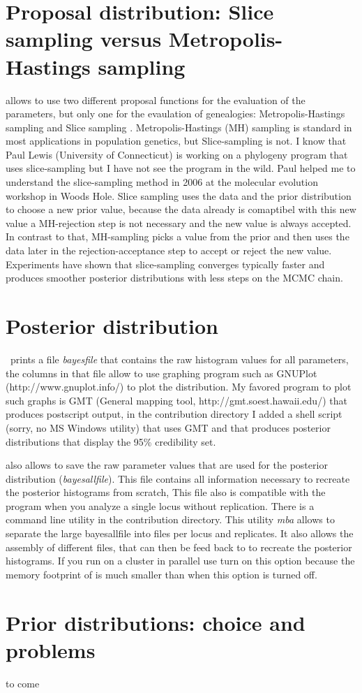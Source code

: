 \section{Proposal distribution: Slice sampling versus Metropolis-Hastings sampling}
\migrate allows to use two different proposal functions for the evaluation of the parameters, but only one for the evaulation of genealogies: Metropolis-Hastings sampling \cite{metropolis:1953:ESC} and Slice sampling \citep{Neal:2003}. Metropolis-Hastings (MH) sampling is standard in most applications in population genetics, but Slice-sampling is not. I know that Paul Lewis (University of Connecticut) is working on a phylogeny program that uses slice-sampling but I have not see the program in the wild. Paul helped me to understand the slice-sampling method in 2006 at the molecular evolution workshop in Woods Hole.
Slice sampling uses the data and the prior distribution to choose a new prior value, because the data already is comaptibel with this new value a MH-rejection step is not necessary and the new value is always accepted. In contrast to that, MH-sampling picks a value from the prior and then uses the data later in the rejection-acceptance step to accept or reject the new value. Experiments have shown that slice-sampling converges  typically faster and produces smoother posterior distributions with less steps on the MCMC chain.

\section{Posterior distribution}
\migrate\ prints a file \textsl{bayesfile} that contains the raw histogram values for all parameters, the columns in that file allow to use  graphing program such as GNUPlot (http://www.gnuplot.info/) to plot the distribution. My favored program to plot such graphs is GMT (General mapping tool, http://gmt.soest.hawaii.edu/) that produces postscript output, in the contribution directory I added a shell script
(sorry, no MS Windows utility) that uses GMT and that produces posterior distributions that display the 95\% credibility set. 

\migrate also allows to save the raw parameter values that are used for the posterior distribution (\textsl{bayesallfile}). This file contains all information necessary to recreate the posterior histograms from scratch, This file also is compatible with the program \tracer \citep{Rambaut:2007} when you analyze a single locus without replication. There is a command line utility in the contribution directory. This utility \textsl{mba} allows to separate the large bayesallfile into files per locus and replicates. It also allows the assembly of different files, that can then be feed back to \migrate to recreate the posterior histograms.
If you run \migrate on a cluster in parallel use turn on this option because the memory footprint of \migrate is much smaller than when this option is turned off. 

\section{Prior distributions: choice and problems}
to come
